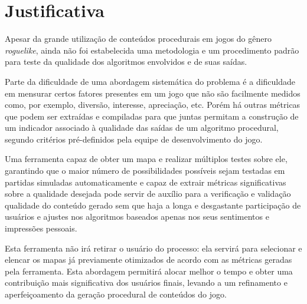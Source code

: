 \chapter[Justificativa]{Justificativa}

Apesar da grande utilização de conteúdos procedurais em jogos do gênero \textit{roguelike}, ainda não foi estabelecida uma metodologia e um procedimento padrão para teste da qualidade dos algoritmos envolvidos e de suas saídas.

Parte da dificuldade de uma abordagem sistemática do problema é a dificuldade em mensurar certos fatores presentes em um jogo que não são facilmente medidos como, por exemplo, diversão, interesse, apreciação, etc. Porém há outras métricas que podem ser extraídas e compiladas para que juntas permitam a construção de um indicador associado à qualidade das saídas de um algoritmo procedural, segundo critérios pré-definidos pela equipe de desenvolvimento do jogo.

Uma ferramenta capaz de obter um mapa e realizar múltiplos testes sobre ele, garantindo que o maior número de possibilidades possíveis sejam testadas em partidas simuladas automaticamente e capaz de extrair métricas significativas sobre a qualidade desejada pode servir de auxílio para a verificação e validação qualidade do conteúdo gerado sem que haja a longa e desgastante participação de usuários e ajustes nos algoritmos baseados apenas nos seus sentimentos e impressões pessoais.

Esta ferramenta não irá retirar o usuário do processo: ela servirá para selecionar e elencar  os mapas já previamente otimizados de acordo com as métricas geradas pela ferramenta. Esta abordagem permitirá alocar melhor o tempo e obter uma contribuição mais significativa dos usuários finais, levando a um refinamento e aperfeiçoamento da geração procedural de conteúdos do jogo.

